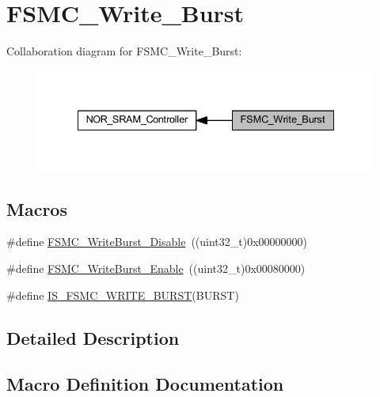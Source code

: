 \hypertarget{group___f_s_m_c___write___burst}{}\section{F\+S\+M\+C\+\_\+\+Write\+\_\+\+Burst}
\label{group___f_s_m_c___write___burst}
Collaboration diagram for F\+S\+M\+C\+\_\+\+Write\+\_\+\+Burst\+:
\nopagebreak
\begin{figure}[H]
\begin{center}
\leavevmode
\includegraphics[width=335pt]{group___f_s_m_c___write___burst}
\end{center}
\end{figure}
\subsection*{Macros}
\begin{DoxyCompactItemize}
\item 
\#define \hyperlink{group___f_s_m_c___write___burst_ga65a49ecd05b3a128e8908c6a625adae7}{F\+S\+M\+C\+\_\+\+Write\+Burst\+\_\+\+Disable}~((uint32\+\_\+t)0x00000000)
\item 
\#define \hyperlink{group___f_s_m_c___write___burst_ga1b2b66a0eb42778c2cc9a05003cf7655}{F\+S\+M\+C\+\_\+\+Write\+Burst\+\_\+\+Enable}~((uint32\+\_\+t)0x00080000)
\item 
\#define \hyperlink{group___f_s_m_c___write___burst_gab7b03a33fab765827832abbf07d01a10}{I\+S\+\_\+\+F\+S\+M\+C\+\_\+\+W\+R\+I\+T\+E\+\_\+\+B\+U\+R\+ST}(B\+U\+R\+ST)
\end{DoxyCompactItemize}


\subsection{Detailed Description}


\subsection{Macro Definition Documentation}
\mbox{\label{group___f_s_m_c___write___burst_ga65a49ecd05b3a128e8908c6a625adae7}} 
